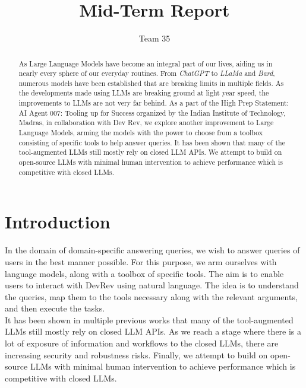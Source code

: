 \documentclass[10pt,twocolumn,letterpaper]{article}
\begin{document}
\title{%
Mid-Term Report}

\author{Team 35}
\maketitle

\begin{abstract}
As Large Language Models have become an integral part of our lives, aiding us in nearly every sphere of our everyday routines. From \textit{ChatGPT} to \textit{LLaMa} and \textit{Bard}, numerous models have been established that are breaking limits in multiple fields. As the developments made using LLMs are breaking ground at light year speed, the improvements to LLMs are not very far behind. As a part of the High Prep Statement: AI Agent 007: Tooling up for Success organized by the Indian Institute of Technology, Madras, in collaboration with Dev Rev, we explore another improvement to Large Language Models, arming the models with the power to choose from a toolbox consisting of specific tools to help answer queries. It has been shown that many of the tool-augmented LLMs still mostly rely on closed LLM APIs. We attempt to build on open-source LLMs with minimal human intervention to achieve performance which is competitive with closed LLMs.
\end{abstract}

\section{Introduction}
In the domain of domain-specific answering queries, we wish to answer queries of users in the best manner possible. For this purpose, we arm ourselves with language models, along with a toolbox of specific tools. The aim is to enable users to interact with DevRev using natural language. The idea is to understand the queries, map them to the tools necessary along with the relevant arguments, and then execute the tasks.\\
It has been shown in multiple previous works that many of the tool-augmented LLMs still mostly rely on closed LLM APIs. As we reach a stage where there is a lot of exposure of information and workflows to the closed LLMs, there are increasing security and robustness risks. Finally, we attempt to build on open-source LLMs with minimal human intervention to achieve performance which is competitive with closed LLMs.
\end{document}
